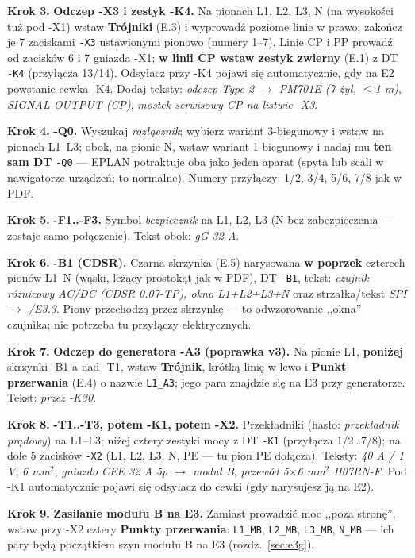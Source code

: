 \documentclass[11pt,a4paper]{article}
\newcommand{\ui}[1]{\textbf{#1}}                    %
\newcommand{\krok}[1]{\par\medskip\noindent\textbf{\color{granat}Krok #1.}\space}
\begin{document}
\krok{3} \textbf{Odczep -X3 i zestyk -K4.} Na pionach L1, L2, L3, N (na wysokości tuż pod -X1)
wstaw \ui{Trójniki} (E.3) i wyprowadź poziome linie w prawo; zakończ je 7 zaciskami \texttt{-X3}
ustawionymi pionowo (numery 1--7). Linie CP i PP prowadź od zacisków 6 i 7 gniazda -X1;
\textbf{w linii CP wstaw zestyk zwierny} (E.1) z DT \texttt{-K4} (przyłącza 13/14). Odsyłacz przy
-K4 pojawi się automatycznie, gdy na E2 powstanie cewka -K4. Dodaj teksty: \emph{odczep Type 2
$\to$ PM701E (7 żył, $\le$1 m)}, \emph{SIGNAL OUTPUT (CP)}, \emph{mostek serwisowy CP na
listwie -X3}.

\krok{4} \textbf{-Q0.} Wyszukaj \emph{rozłącznik}; wybierz wariant 3-biegunowy i wstaw na pionach
L1--L3; obok, na pionie N, wstaw wariant 1-biegunowy i nadaj mu \textbf{ten sam DT} \texttt{-Q0}
--- EPLAN potraktuje oba jako jeden aparat (spyta lub scali w nawigatorze urządzeń; to normalne).
Numery przyłączy: 1/2, 3/4, 5/6, 7/8 jak w PDF.

\krok{5} \textbf{-F1..-F3.} Symbol \emph{bezpiecznik} na L1, L2, L3 (N bez zabezpieczenia ---
zostaje samo połączenie). Tekst obok: \emph{gG 32 A}.

\krok{6} \textbf{-B1 (CDSR).} Czarna skrzynka (E.5) narysowana \textbf{w poprzek} czterech pionów
L1--N (wąski, leżący prostokąt jak w PDF), DT \texttt{-B1}, tekst: \emph{czujnik różnicowy AC/DC
(CDSR 0.07-TP), okno L1+L2+L3+N} oraz strzałka/tekst \emph{SPI $\to$ /E3.3}. Piony przechodzą
przez skrzynkę --- to odwzorowanie ,,okna'' czujnika; nie potrzeba tu przyłączy elektrycznych.

\krok{7} \textbf{Odczep do generatora -A3 (poprawka v3).} Na pionie L1, \textbf{poniżej} skrzynki
-B1 a nad -T1, wstaw \ui{Trójnik}, krótką linię w lewo i \ui{Punkt przerwania} (E.4) o nazwie
\texttt{L1\_A3}; jego para znajdzie się na E3 przy generatorze. Tekst: \emph{przez -K30}.

\krok{8} \textbf{-T1..-T3, potem -K1, potem -X2.} Przekładniki (hasło: \emph{przekładnik prądowy})
na L1--L3; niżej cztery zestyki mocy z DT \texttt{-K1} (przyłącza 1/2\ldots7/8); na dole 5 zacisków
\texttt{-X2} (L1, L2, L3, N, PE --- tu pion PE dołącza). Teksty: \emph{40 A / 1 V},
\emph{6 mm$^2$}, \emph{gniazdo CEE 32 A 5p $\to$ moduł B}, \emph{przewód 5$\times$6 mm$^2$
H07RN-F}. Pod -K1 automatycznie pojawi się odsyłacz do cewki (gdy narysujesz ją na E2).

\krok{9} \textbf{Zasilanie modułu B na E3.} Zamiast prowadzić moc ,,poza stronę'', wstaw przy
-X2 cztery \ui{Punkty przerwania}: \texttt{L1\_MB}, \texttt{L2\_MB}, \texttt{L3\_MB},
\texttt{N\_MB} --- ich pary będą początkiem szyn modułu B na E3 (rozdz.~\ref{sec:e3g}).
\end{document}
